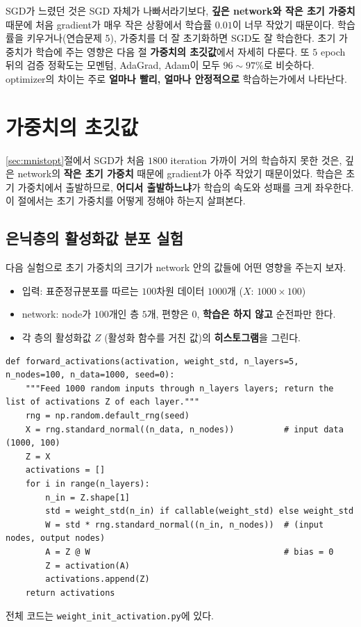 \documentclass[11pt,a4paper]{article}
\begin{document}
\begin{remarkbox}
SGD가 느렸던 것은 SGD 자체가 나빠서라기보다,
\textbf{깊은 network와 작은 초기 가중치} 때문에 처음 gradient가 매우 작은 상황에서
학습률 $0.01$이 너무 작았기 때문이다.
학습률을 키우거나(연습문제 5), 가중치를 더 잘 초기화하면 SGD도 잘 학습한다.
초기 가중치가 학습에 주는 영향은 다음 절 \textbf{가중치의 초깃값}에서 자세히 다룬다.
또 $5$ epoch 뒤의 검증 정확도는 모멘텀, AdaGrad, Adam이 모두 $96\sim97\%$로 비슷하다.
optimizer의 차이는 주로 \textbf{얼마나 빨리, 얼마나 안정적으로} 학습하는가에서 나타난다.
\end{remarkbox}

\section{가중치의 초깃값}\label{sec:init}

\ref{sec:mnistopt}절에서 SGD가 처음 $1800$ iteration 가까이 거의 학습하지 못한 것은,
깊은 network의 \textbf{작은 초기 가중치} 때문에 gradient가 아주 작았기 때문이었다.
학습은 초기 가중치에서 출발하므로, \textbf{어디서 출발하느냐}가 학습의 속도와 성패를 크게 좌우한다.
이 절에서는 초기 가중치를 어떻게 정해야 하는지 살펴본다.

\subsection{은닉층의 활성화값 분포 실험}

다음 실험으로 초기 가중치의 크기가 network 안의 값들에 어떤 영향을 주는지 보자.
\begin{itemize}[leftmargin=1.8em]
\item 입력: 표준정규분포를 따르는 $100$차원 데이터 $1000$개 ($X$: $1000\times100$)
\item network: node가 $100$개인 층 $5$개, 편향은 $0$, \textbf{학습은 하지 않고} 순전파만 한다.
\item 각 층의 활성화값 $Z$ (활성화 함수를 거친 값)의 \textbf{히스토그램}을 그린다.
\end{itemize}

\begin{lstlisting}
def forward_activations(activation, weight_std, n_layers=5, n_nodes=100, n_data=1000, seed=0):
    """Feed 1000 random inputs through n_layers layers; return the list of activations Z of each layer."""
    rng = np.random.default_rng(seed)
    X = rng.standard_normal((n_data, n_nodes))          # input data (1000, 100)
    Z = X
    activations = []
    for i in range(n_layers):
        n_in = Z.shape[1]
        std = weight_std(n_in) if callable(weight_std) else weight_std
        W = std * rng.standard_normal((n_in, n_nodes))  # (input nodes, output nodes)
        A = Z @ W                                       # bias = 0
        Z = activation(A)
        activations.append(Z)
    return activations
\end{lstlisting}
전체 코드는 \texttt{weight\_init\_activation.py}에 있다.
\end{document}
